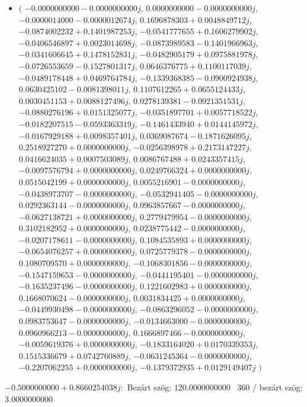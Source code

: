 \documentclass[14pt,a4paper]{article}
\begin{document}
\begin{itemize}
\item
$\big($
$-0.0000000000-0.0000000000j$, $0.0000000000-0.0000000000j$, $-0.0000014000-0.0000012674j$, $0.1696878303+0.0048849712j$, $-0.0874002232+0.1401987253j$, $-0.0541777655+0.1606279902j$, $-0.0406546897+0.0023014698j$, $-0.0873989583-0.1401966963j$, $-0.0341606645+0.1478152831j$, $-0.0482905179+0.0975881978j$, $-0.0726553659-0.1527801317j$, $0.0646376775+0.1100117039j$, $-0.0489178448+0.0469764784j$, $-0.1339368385-0.0900924938j$, $0.0630425102-0.0081398011j$, $0.1107612265+0.0655124433j$, $0.0030451153+0.0088127496j$, $0.0278139381-0.0921351531j$, $-0.0880276196+0.0151325077j$, $-0.0351897701+0.0057718522j$, $-0.0182207515-0.0593363319j$, $-0.1461433940+0.0144145972j$, $-0.0167929188+0.0098357401j$, $0.0369087674-0.1871626095j$, $0.2518927270+0.0000000000j$, $-0.0256398978+0.2173147227j$, $0.0416624035+0.0007503089j$, $0.0086767488+0.0243357415j$, $-0.0097576794+0.0000000000j$, $0.0249766324+0.0000000000j$, $0.0515042199+0.0000000000j$, $0.0055216901-0.0000000000j$, $-0.0438973707-0.0000000000j$, $-0.0532941405-0.0000000000j$, $0.0292363144-0.0000000000j$, $0.0963857667-0.0000000000j$, $-0.0627138721+0.0000000000j$, $0.2779479954-0.0000000000j$, $0.3102182952+0.0000000000j$, $0.0238775442-0.0000000000j$, $-0.0207178611-0.0000000000j$, $0.1084535893+0.0000000000j$, $-0.0654076257+0.0000000000j$, $0.0725779378-0.0000000000j$, $0.1080709570+0.0000000000j$, $-0.1068301856-0.0000000000j$, $-0.1547159653-0.0000000000j$, $-0.0441195401-0.0000000000j$, $-0.1635237496-0.0000000000j$, $0.1221602983+0.0000000000j$, $0.1668070624-0.0000000000j$, $0.0031834425+0.0000000000j$, $-0.0449930498-0.0000000000j$, $-0.0863296052-0.0000000000j$, $0.0983753647-0.0000000000j$, $-0.0134663000-0.0000000000j$, $0.0960966213-0.0000000000j$, $0.1666897466-0.0000000000j$, $-0.0059619376+0.0000000000j$, $-0.1833164020+0.0170339353j$, $0.1515336679+0.0742760889j$, $-0.0631245364-0.0000000000j$, $-0.2207062255+0.0000000000j$, $-0.1379372935+0.0129149407j$
$\big)$
\end{itemize}
$-0.5000000000+0.8660254038j$:\
Bezárt szög: $120.0000000000$ \
360 / bezárt szög: $3.0000000000$\
\end{document}
